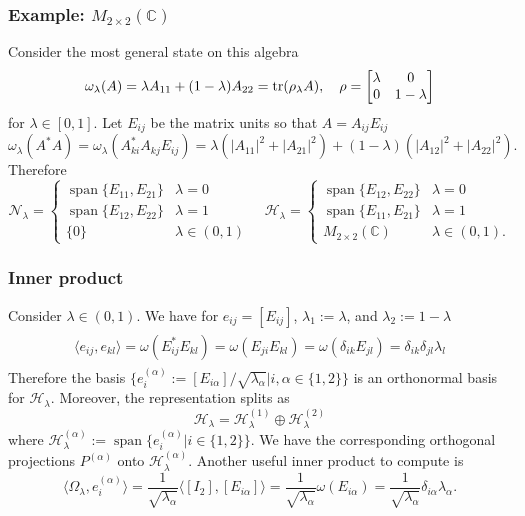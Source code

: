 \documentclass{beamer}
\DeclareMathOperator{\Span}{span}
\begin{document}
\begin{frame}
	\frametitle{Example: $M_{2\times 2}(\mathbb{C})$}
	Consider the most general state on this algebra
	\begin{equation}
		\omega_\lambda(A)=\lambda A_{11} + (1-\lambda) A_{22}=\tr(\rho_\lambda A),\quad\rho=\mqty[\lambda & 0\\0& 1-\lambda]
	\end{equation}
	for $\lambda\in[0,1]$. Let $E_{ij}$ be the matrix units so that $A=A_{ij}E_{ij}$
	\begin{equation*}
		\omega_\lambda(A^*A)=\omega_\lambda(A^*_{ki}A_{kj}E_{ij})=\lambda(|A_{11}|^2+|A_{21}|^2)+(1-\lambda)(|A_{12}|^2+|A_{22}|^2).
	\end{equation*}
	Therefore
	\begin{equation*}
		\mathcal{N}_\lambda=\begin{cases}
		\Span\{E_{11},E_{21}\} & \lambda = 0\\
		\Span\{E_{12},E_{22}\} & \lambda = 1\\
		\{0\} & \lambda\in(0,1)
		\end{cases}\quad
		\mathcal{H}_\lambda=\begin{cases}
		\Span\{E_{12},E_{22}\} & \lambda = 0\\
		\Span\{E_{11},E_{21}\} & \lambda = 1\\
		M_{2\times 2}(\mathbb{C}) & \lambda\in(0,1).
		\end{cases}
	\end{equation*}
\end{frame}

\begin{frame}
	\frametitle{Inner product}
	Consider $\lambda\in(0,1)$. We have for $e_{ij}=[E_{ij}]$, $\lambda_1:=\lambda$, and $\lambda_2:=1-\lambda$
	\begin{align}
	\begin{split}
		\langle e_{ij},e_{kl}\rangle=\omega(E_{ij}^*E_{kl})=\omega(E_{ji}E_{kl})=\omega(\delta_{ik}E_{jl})=\delta_{ik}\delta_{jl}\lambda_l
	\end{split}
	\end{align}
	Therefore the basis $\{e_i^{(\alpha)}:=[E_{i\alpha}]/\sqrt{\lambda_\alpha}|i,\alpha\in\{1,2\}\}$ is an orthonormal basis for $\mathcal{H}_\lambda$. Moreover, the representation splits as
	\begin{equation}
		\mathcal{H}_\lambda=\mathcal{H}_\lambda^{(1)}\oplus\mathcal{H}_\lambda^{(2)}
	\end{equation}
	where $\mathcal{H}_\lambda^{(\alpha)}:=\Span\{e_i^{(\alpha)}|i\in\{1,2\}\}$. We have the corresponding orthogonal projections $P^{(\alpha)}$ onto $\mathcal{H}_\lambda^{(\alpha)}$.
	Another useful inner product to compute is
	\begin{equation}
		\langle\Omega_\lambda,e_i^{(\alpha)}\rangle=\frac{1}{\sqrt{\lambda_\alpha}}\langle[I_2],[E_{i\alpha}]\rangle=\frac{1}{\sqrt{\lambda_\alpha}}\omega(E_{i\alpha})=\frac{1}{\sqrt{\lambda_\alpha}}\delta_{i\alpha}\lambda_\alpha.
	\end{equation}
\end{frame}
\end{document}
